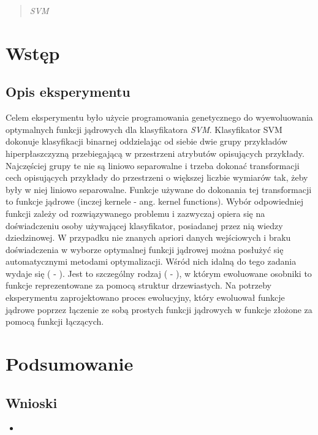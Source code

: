 \documentclass{article}
\begin{document}


\begin{abstract}
\emph{SVM} 
\end{abstract}


\section{Wstęp}
	\subsection{Opis eksperymentu}
	Celem eksperymentu było użycie programowania genetycznego do wyewoluowania optymalnych funkcji jądrowych dla klasyfikatora \emph{SVM}.
	Klasyfikator SVM dokonuje klasyfikacji binarnej oddzielając od siebie dwie grupy przykładów hiperpłaszczyzną przebiegającą w przestrzeni atrybutów opisujących przykłady. Najczęściej grupy te nie są liniowo separowalne i trzeba dokonać transformacji cech opisujących przykłady do przestrzeni o większej liczbie wymiarów tak, żeby były w niej liniowo separowalne. Funkcje używane do dokonania tej transformacji to funkcje jądrowe  (inczej kernele  - ang. kernel functions). Wybór odpowiedniej funkcji zależy od rozwiązywanego problemu i zazwyczaj opiera się na doświadczeniu osoby używającej klasyfikator, posiadanej przez nią wiedzy dziedzinowej. W przypadku nie znanych apriori danych wejściowych i braku doświadczenia w wyborze optymalnej funkcji jądrowej można posłużyć się automatycznymi metodami optymalizacji. Wśród nich idalną do tego zadania wydaje się  ( - ). Jest to szczególny rodzaj  ( - ), w którym ewoluowane osobniki to funkcje reprezentowane za pomocą struktur drzewiastych.
	Na potrzeby eksperymentu zaprojektowano proces ewolucyjny, który ewoluował funkcje jądrowe poprzez łączenie ze sobą prostych funkcji jądrowych w funkcje złożone za pomocą funkcji łączących.
	
	
	
	



		
		
\section{Podsumowanie}
	\subsection{Wnioski}
		\begin{itemize}
			\item 
		\end{itemize}



%
%
\end{document}
